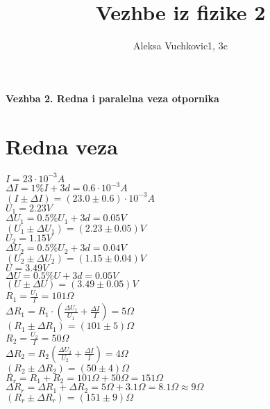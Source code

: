 \documentclass[11pt]{article}
\title{\bf{Vezhbe iz fizike 2}}
\author{\Large Aleksa Vuchkovic1, 3c}
\date{}
\newcommand\D{\displaystyle}
\begin{document}
\maketitle
\large

\textbf{\Large Vezhba 2. Redna i paralelna veza otpornika}\\
\section{Redna veza}
$I = 23\cdot 10^{-3}A$\\
$\Delta I = 1\%I+3d=0.6\cdot  10^{-3}A$\\
$(I\pm\Delta I) = (23.0\pm 0.6)\cdot 10^{-3}A$\\

$U_1 = 2.23V$\\
$\Delta U_1=0.5\%U_1+3d=0.05V$\\
$(U_1\pm\Delta U_1) = (2.23\pm 0.05)V$\\

$U_2 = 1.15V$\\
$\Delta U_2 = 0.5\%U_2+3d=0.04V$\\
$(U_2\pm\Delta U_2) = (1.15\pm 0.04)V$\\

$U = 3.49V$\\
$\Delta U = 0.5\%U+3d=0.05V$\\
$(U\pm\Delta U) = (3.49\pm 0.05)V$\\

$R_1 =\D\frac{U_1}{I} = 101\Omega$\\
$\Delta R_1 = R_1\cdot\left(\D\frac{\Delta U_1}{U_1}+\D\frac{\Delta I}{I}\right)=5\Omega$\\
$(R_1\pm\Delta R_1) = (101\pm 5)\Omega$\\

$R_2 =\D\frac{U_2}{I} = 50\Omega$\\
$\Delta R_2 = R_2\left(\D\frac{\Delta U_2}{U_2}+\D\frac{\Delta I}{I}\right) = 4\Omega$\\
$(R_2\pm\Delta R_2) = (50 \pm 4)\Omega$\\

$R_r = R_1 + R_2 = 101\Omega+50\Omega=151\Omega$\\
$\Delta R_r = \Delta R_1 +\Delta R_2 = 5\Omega+3.1\Omega = 8.1\Omega \approx 9\Omega$\\
$(R_r\pm\Delta R_r) = (151\pm 9)\Omega$\\
\end{document}
